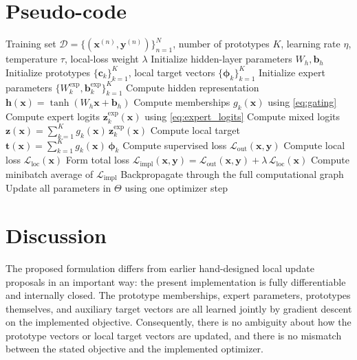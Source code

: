 \documentclass{article}
\theoremstyle{definition}
\theoremstyle{remark}
\begin{document}
\section{Pseudo-code}

\begin{algorithm}[t]
\caption{Geometry-Aware Prototype-Conditioned End-to-End Training}
\label{alg:galca}
\begin{algorithmic}[1]
\Require Training set $\mathcal{D}=\{(\mathbf{x}^{(n)},\mathbf{y}^{(n)})\}_{n=1}^{N}$, number of prototypes $K$, learning rate $\eta$, temperature $\tau$, local-loss weight $\lambda$
\State Initialize hidden-layer parameters $W_h,\mathbf{b}_h$
\State Initialize prototypes $\{\mathbf{c}_k\}_{k=1}^{K}$, local target vectors $\{\boldsymbol{\phi}_k\}_{k=1}^{K}$
\State Initialize expert parameters $\{W_k^{\mathrm{exp}},\mathbf{b}_k^{\mathrm{exp}}\}_{k=1}^{K}$
            \State Compute hidden representation $\mathbf{h}(\mathbf{x})=\tanh(W_h\mathbf{x}+\mathbf{b}_h)$
            \State Compute memberships $g_k(\mathbf{x})$ using \eqref{eq:gating}
            \State Compute expert logits $\mathbf{z}_k^{\mathrm{exp}}(\mathbf{x})$ using \eqref{eq:expert_logits}
            \State Compute mixed logits $\mathbf{z}(\mathbf{x})=\sum_{k=1}^{K}g_k(\mathbf{x})\,\mathbf{z}_k^{\mathrm{exp}}(\mathbf{x})$
            \State Compute local target $\mathbf{t}(\mathbf{x})=\sum_{k=1}^{K}g_k(\mathbf{x})\,\boldsymbol{\phi}_k$
            \State Compute supervised loss $\mathcal{L}_{\mathrm{out}}(\mathbf{x},\mathbf{y})$
            \State Compute local loss $\mathcal{L}_{\mathrm{loc}}(\mathbf{x})$
            \State Form total loss $\mathcal{L}_{\mathrm{impl}}(\mathbf{x},\mathbf{y})=\mathcal{L}_{\mathrm{out}}(\mathbf{x},\mathbf{y})+\lambda\,\mathcal{L}_{\mathrm{loc}}(\mathbf{x})$
        \EndFor
        \State Compute minibatch average of $\mathcal{L}_{\mathrm{impl}}$
        \State Backpropagate through the full computational graph
        \State Update all parameters in $\Theta$ using one optimizer step
    \EndFor
\EndFor
\end{algorithmic}
\end{algorithm}

\section{Discussion}

The proposed formulation differs from earlier hand-designed local update proposals in an important way: the present implementation is fully differentiable and internally closed. The prototype memberships, expert parameters, prototypes themselves, and auxiliary target vectors are all learned jointly by gradient descent on the implemented objective. Consequently, there is no ambiguity about how the prototype vectors or local target vectors are updated, and there is no mismatch between the stated objective and the implemented optimizer.
\end{document}
